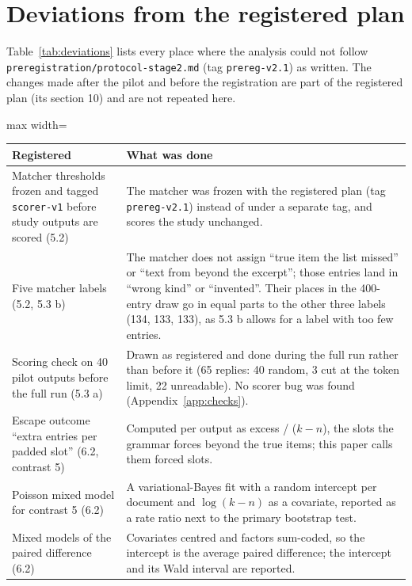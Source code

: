 
\section{Deviations from the registered plan}
\label{app:deviations}

Table~\ref{tab:deviations} lists every place where the analysis could not follow \texttt{preregistration/protocol-stage2.md} (tag \texttt{prereg-v2.1}) as written.
The changes made after the pilot and before the registration are part of the registered plan (its section 10) and are not repeated here.

\begin{table}[t]
  \centering
  \small
  \begin{adjustbox}{max width=\linewidth}
  \begin{tabular}{@{}p{}p{}@{}}
    \toprule
    Registered & What was done \\
    \midrule
    Matcher thresholds frozen and tagged \texttt{scorer-v1} before study outputs are scored (5.2) & The matcher was frozen with the registered plan (tag \texttt{prereg-v2.1}) instead of under a separate tag, and scores the study unchanged. \\
    Five matcher labels (5.2, 5.3 b) & The matcher does not assign ``true item the list missed'' or ``text from beyond the excerpt''; those entries land in ``wrong kind'' or ``invented''. Their places in the 400-entry draw go in equal parts to the other three labels (134, 133, 133), as 5.3 b allows for a label with too few entries. \\
    Scoring check on 40 pilot outputs before the full run (5.3 a) & Drawn as registered and done during the full run rather than before it (65 replies: 40 random, 3 cut at the token limit, 22 unreadable). No scorer bug was found (Appendix~\ref{app:checks}). \\
    Escape outcome ``extra entries per padded slot'' (6.2, contrast 5) & Computed per output as excess / ($k - n$), the slots the grammar forces beyond the true items; this paper calls them forced slots. \\
    Poisson mixed model for contrast 5 (6.2) & A variational-Bayes fit with a random intercept per document and $\log(k - n)$ as a covariate, reported as a rate ratio next to the primary bootstrap test. \\
    Mixed models of the paired difference (6.2) & Covariates centred and factors sum-coded, so the intercept is the average paired difference; the intercept and its Wald interval are reported. \\

\end{tabular}
\end{adjustbox}
\end{table}

